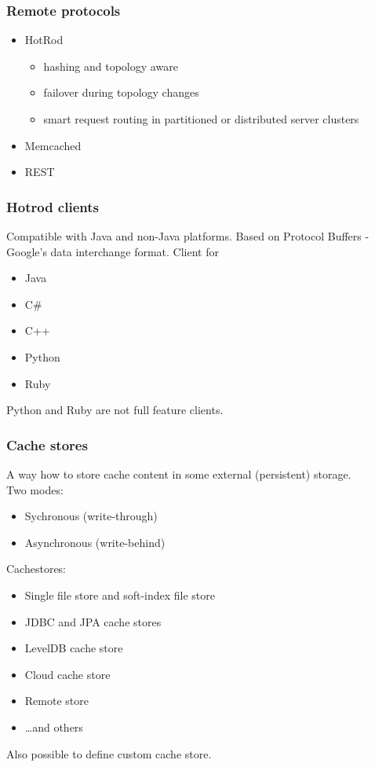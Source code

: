 \documentclass[10pt,utf8]{beamer}
\begin{document}
\begin{frame}
	\frametitle{Remote protocols}
	\begin{itemize}
		\item HotRod
			\begin{itemize}
			\item hashing and topology aware
			\item failover during topology changes
			\item smart request routing in partitioned or distributed server clusters
		\end{itemize}
		\item Memcached
		\item REST
  \end{itemize}
\end{frame}

\begin{frame}
  \frametitle{Hotrod clients}
	Compatible with Java and non-Java platforms. Based on Protocol Buffers - Google's data interchange format. Client for
  \begin{itemize}
    \item Java
		\item C\#
		\item C++
		\item Python
		\item Ruby
  \end{itemize}
	Python and Ruby are not full feature clients.
\end{frame}

\begin{frame}
	\frametitle{Cache stores}
	A way how to store cache content in some external (persistent) storage.\\
	Two modes:
	\begin{itemize}
	 \item Sychronous (write-through)
	 \item Asynchronous (write-behind)
	\end{itemize}
	Cachestores:
	\begin{itemize}
		\item Single file store and soft-index file store
		\item JDBC and JPA cache stores
		\item LevelDB cache store
		\item Cloud cache store
		\item Remote store
		\item \dots and others
  \end{itemize}
	Also possible to define custom cache store.
\end{frame}
\end{document}
